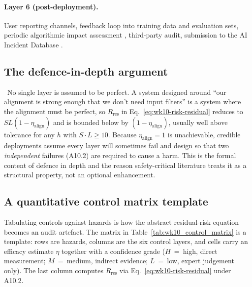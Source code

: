 \paragraph{Layer 6 (post-deployment).} User reporting channels,
feedback loop into training data and evaluation sets,
periodic algorithmic impact assessment
\citep{metcalf2021algorithmic}, third-party audit, submission
to the AI Incident Database \citep{aiid}.

\subsection{The defence-in-depth argument}

\Cons\ No single layer is assumed to be perfect. A system
designed around ``our alignment is strong enough that we don't
need input filters'' is a system where the alignment must be
perfect, so $R_\mathrm{res}$ in
Eq.~\eqref{eq:wk10-risk-residual} reduces to
$S L (1 - \eta_\mathrm{align})$ and is bounded below by
$(1 - \eta_\mathrm{align})$, usually well above tolerance for
any $h$ with $S \cdot L \ge 10$. Because
$\eta_\mathrm{align} = 1$ is unachievable, credible deployments
assume every layer will sometimes fail and design so that two
\emph{independent} failures (A10.2) are required to cause a harm.
This is the formal content of defence in depth and the reason
safety-critical literature treats it as a structural property,
not an optional enhancement.

\subsection{A quantitative control matrix template}
\label{sec:wk10_control_matrix}

Tabulating controls against hazards is how the abstract
residual-risk equation becomes an audit artefact. The matrix in
Table~\ref{tab:wk10_control_matrix} is a template: rows are
hazards, columns are the six control layers, and cells carry an
efficacy estimate $\eta$ together with a confidence grade
($H$~=~high, direct measurement; $M$~=~medium, indirect evidence;
$L$~=~low, expert judgement only). The last column computes
$R_\mathrm{res}$ via
Eq.~\eqref{eq:wk10-risk-residual} under A10.2.

